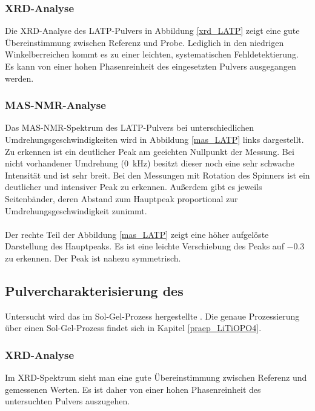\documentclass[a4paper, 11pt, headsepline,footsepline,twoside,abstract]{scrbook}
\begin{document}
\subsubsection{XRD-Analyse}
Die XRD-Analyse des LATP-Pulvers in Abbildung \ref{xrd_LATP} zeigt eine gute Übereinstimmung zwischen Referenz und Probe. Lediglich in den niedrigen Winkelberreichen kommt es zu einer leichten, systematischen Fehldetektierung. Es kann von einer hohen Phasenreinheit des eingesetzten Pulvers ausgegangen werden.
\subsubsection{MAS-NMR-Analyse}
Das MAS-NMR-Spektrum des LATP-Pulvers bei unterschiedlichen Umdrehungsgeschwindigkeiten wird in Abbildung \ref{mas_LATP} links dargestellt. Zu erkennen ist ein deutlicher Peak am geeichten Nullpunkt der Messung. Bei nicht vorhandener Umdrehung (\SI{0}{\kilo\hertz}) besitzt dieser noch eine sehr schwache Intensität und ist sehr breit. Bei den Messungen mit Rotation des Spinners ist ein deutlicher und intensiver Peak zu erkennen. Außerdem gibt es jeweils Seitenbänder, deren Abstand zum Hauptpeak proportional zur Umdrehungsgeschwindigkeit zunimmt.
\\\\
Der rechte Teil der Abbildung \ref{mas_LATP} zeigt eine höher aufgelöste Darstellung des Hauptpeaks. Es ist eine leichte Verschiebung des Peaks auf \SI{-0.3}{\nmrppm} zu erkennen. Der Peak ist nahezu symmetrisch. 
\subsection{Pulvercharakterisierung des }
Untersucht wird das im Sol-Gel-Prozess hergestellte . Die genaue Prozessierung über einen Sol-Gel-Prozess findet sich in Kapitel \ref{praep_LiTiOPO4}.
\subsubsection{XRD-Analyse}
Im XRD-Spektrum sieht man eine gute Übereinstimmung zwischen Referenz und gemessenen Werten. Es ist daher von einer hohen Phasenreinheit des untersuchten Pulvers auszugehen.
\end{document}
